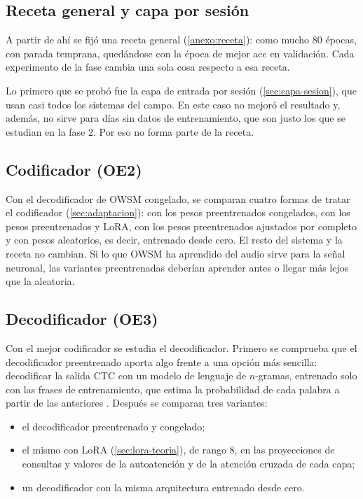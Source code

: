 \subsection{Receta general y capa por sesión}

A partir de ahí se fijó una receta general (\cref{anexo:receta}): como mucho 80 épocas, con parada temprana, quedándose con la época de mejor acc en validación. Cada experimento de la fase cambia una sola cosa respecto a esa receta.

Lo primero que se probó fue la capa de entrada por sesión (\cref{sec:capa-sesion}), que usan casi todos los sistemas del campo. En este caso no mejoró el resultado y, además, no sirve para días sin datos de entrenamiento, que son justo los que se estudian en la fase 2. Por eso no forma parte de la receta.

\subsection{Codificador (OE2)}

Con el decodificador de OWSM congelado, se comparan cuatro formas de tratar el codificador (\cref{sec:adaptacion}): con los pesos preentrenados congelados, con los pesos preentrenados y LoRA, con los pesos preentrenados ajustados por completo y con pesos aleatorios, es decir, entrenado desde cero. El resto del sistema y la receta no cambian. Si lo que OWSM ha aprendido del audio sirve para la señal neuronal, las variantes preentrenadas deberían aprender antes o llegar más lejos que la aleatoria.

\subsection{Decodificador (OE3)}

Con el mejor codificador se estudia el decodificador. Primero se comprueba que el decodificador preentrenado aporta algo frente a una opción más sencilla: decodificar la salida CTC con un modelo de lenguaje de $n$-gramas, entrenado solo con las frases de entrenamiento, que estima la probabilidad de cada palabra a partir de las anteriores \cite{heafield2011kenlm}. Después se comparan tres variantes:

\begin{itemize}[leftmargin=*, itemsep=0.3em]
  \item el decodificador preentrenado y congelado;
  \item el mismo con LoRA (\cref{sec:lora-teoria}), de rango 8, en las proyecciones de consultas y valores de la autoatención y de la atención cruzada de cada capa;
  \item un decodificador con la misma arquitectura entrenado desde cero.
\end{itemize}

